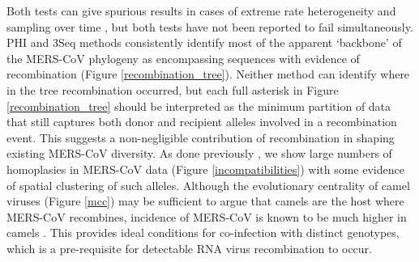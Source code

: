 \documentclass[11pt,oneside,letterpaper]{article}
\begin{document}
Both tests can give spurious results in cases of extreme rate heterogeneity and sampling over time \citep{dudas_mers-cov_2016}, but both tests have not been reported to fail simultaneously.
PHI and 3Seq methods consistently identify most of the apparent `backbone' of the MERS-CoV phylogeny as encompassing sequences with evidence of recombination (Figure \ref{recombination_tree}).
Neither method can identify where in the tree recombination occurred, but each full asterisk in Figure \ref{recombination_tree} should be interpreted as the minimum partition of data that still captures both donor and recipient alleles involved in a recombination event.
This suggests a non-negligible contribution of recombination in shaping existing MERS-CoV diversity.
As done previously \citep{dudas_mers-cov_2016}, we show large numbers of homoplasies in MERS-CoV data (Figure \ref{incompatibilities}) with some evidence of spatial clustering of such alleles.
Although the evolutionary centrality of camel viruses (Figure \ref{mcc}) may be sufficient to argue that camels are the host where MERS-CoV recombines, incidence of MERS-CoV is known to be much higher in camels \citep{muller_2014,corman_antibodies_2014,chu_2014,reusken_2014,ali_systematic_2017}.
This provides ideal conditions for co-infection with distinct genotypes, which is a pre-requisite for detectable RNA virus recombination to occur.
\end{document}
